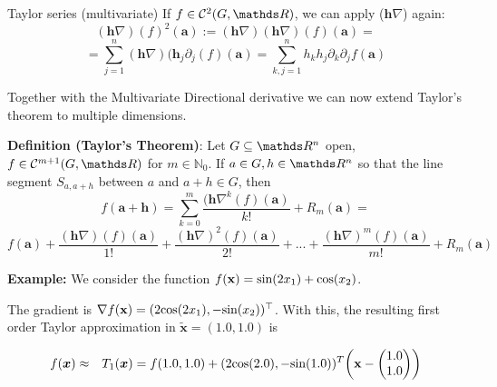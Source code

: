 \begin{vbframe}{Taylor series (multivariate)}
    If $f \in \mathcal{C}^{2}(G,\R)$, we can apply ($\bm{h}\nabla$) again:
    $$(\bm{h}\nabla)(f)^{2}(\bm{a}) := (\bm{h}\nabla)(\bm{h}\nabla)(f)(\bm{a}) = $$
    $$ = \sum_{j=1}^{n}(\bm{h}\nabla)(\bm{h}_{j}\partial_{j}(f)(\bm{a}) = \sum_{k,j=1}^{n}h_{k}h_{j}\partial_{k}\partial_{j}f(\bm{a})$$

  \framebreak

    Together with the Multivariate Directional derivative we can now extend Taylor's theorem to multiple dimensions.
    
    \vspace*{0.2cm}
    
    \textbf{Definition (Taylor's Theorem)}: Let $G \subseteq \R^{n}$ open, $f \in \mathcal{C}^{m+1}(G,\R)$ for $m \in \mathbb{N}_0$.
    If $a \in G, h \in \R^{n}$ so that the line segment $S_{a, a+h}$ between $a$ and $a+h \in G$, then
    $$f(\bm{a+h}) = \sum_{k=0}^{m} \frac{(\bm{h}\nabla^{k}(f)(\bm{a})}{k!} + R_{m}(\bm{a}) = $$
    $$f(\bm{a}) + \frac{(\bm{h}\nabla)(f)(\bm{a})}{1!} + \frac{(\bm{h}\nabla)^{2}(f)(\bm{a})}{2!} + ... + \frac{(\bm{h}\nabla)^{m}(f)(\bm{a})}{m!} + R_{m}(\bm{a})$$
    
  

  \framebreak

  
  \textbf{Example: } We consider the function $f(\mathbf{x}) = \text{sin}(2x_1) + \text{cos}(x_2)$.
  
  \vspace*{0.2cm}
  
  The gradient is $\nabla f(\mathbf{x}) = (2\text{cos}(2x_1), -\text{sin}(x_2))^\top$. With this, the resulting first order Taylor approximation in $\bm{\tilde x} = (1.0, 1.0)$ is
  \vspace*{-0.5cm}
  
  \begin{eqnarray*}
  f(\bm{x}) &\approx& T_1(\bm{x}) = f(1.0, 1.0) + (2\text{cos}(2.0), -\text{sin}(1.0))^T\biggl(\mathbf{x}- \begin{pmatrix}1.0 \\ 1.0 \end{pmatrix}\biggr) 
  \end{eqnarray*}
  

\end{vbframe}
